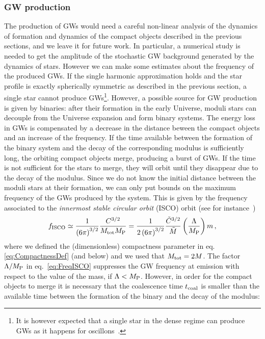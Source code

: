 \documentclass[11pt,a4paper]{article}
\begin{document}
\subsubsection{GW production}

The production of GWs would need a careful non-linear analysis of the dynamics of formation and dynamics of the compact objects described in the previous sections, and we leave it for future work. In particular, a numerical study is needed to get the amplitude of the stochastic GW background generated by the dynamics of stars. However we can make some estimates about the frequency of the produced GWs. If the single harmonic approximation holds and the star profile is exactly spherically symmetric as described in the previous section, a single star cannot produce GWs\footnote{It is however expected that a single star in the dense regime can produce GWs as it happens for oscillons~\cite{Antusch:2016con, Antusch:2017flz}.}. However, a possible source for GW production is given by binaries: after their formation in the early Universe, moduli stars can decouple from the Universe expansion and form binary systems. The energy loss in GWs is compensated by a decrease in the distance beween the compact objects and an increase of the frequency. If the time available between the formation of the binary system and the decay of the corresponding modulus is sufficiently long, the orbiting compact objects merge, producing a burst of GWs. If the time is not sufficient for the stars to merge, they will orbit until they disappear due to the decay of the modulus. Since we do not know the initial distance between the moduli stars at their formation, we can only put bounds on the maximum frequency of the GWs produced by the system. This is given by the frequency associated to the \textit{innermost stable circular orbit} (ISCO) orbit (see for instance~\cite{Giudice:2016zpa})
\begin{equation}
\label{eq:FreqISCO}
f_{\rm ISCO} \simeq \frac{1}{\left(6 \pi\right)^{3/2}} \frac{C^{3/2}}{M_{\rm tot} M_{\rm P}} = \frac{1}{2 \left(6 \pi\right)^{3/2}} \frac{\tilde{C}^{3/2}}{\tilde{M}} \left(\frac{\Lambda}{M_{\rm P}}\right) m \,,
\end{equation}
where we defined the (dimensionless) compactness parameter in eq. \eqref{eq:CompactnessDef} (and below) and we used that $M_{\rm tot} = 2 M$. The factor $\Lambda/M_{\rm P}$ in eq.~\eqref{eq:FreqISCO} suppresses the GW frequency at emission with respect to the value of the mass, if $\Lambda < M_{\rm P}$. However, in order for the compact objects to merge it is necessary that the coalescence time $t_{\rm coal}$ is smaller than the available time between the formation of the binary and the decay of the modulus:
\end{document}
